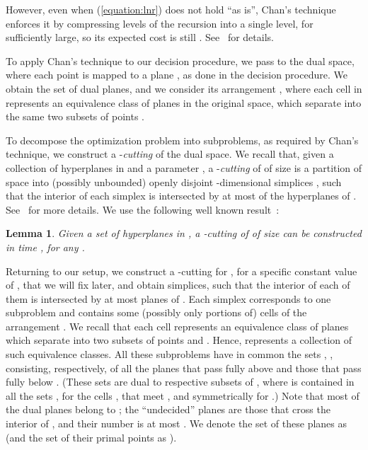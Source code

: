 \documentclass[a4paper,12pt]{article}
\newtheorem{lemma}[theorem]{Lemma}
\begin{document}
However, even when (\ref{equation:lnr}) does not hold ``as
is'', Chan's technique enforces it by compressing  levels of the
recursion into a single level, for  sufficiently large, so its expected cost is still . See~\cite{TCG} for details.


To apply Chan's technique to our decision procedure,
we pass to the dual space, where each point  is mapped to a
plane , as done in the decision procedure. We obtain the set  of dual planes, and we consider its arrangement
, where each cell  in  represents an
equivalence class of planes in the original space, which separate 
into the same two subsets of points .

To decompose the optimization problem into subproblems, as required
by Chan's technique, we construct a -\emph{cutting} of
the dual space. We recall that, given a collection  of 
hyperplanes in  and a parameter , a -\emph{cutting} of  of size  is a
partition of space into  (possibly unbounded) openly disjoint
-dimensional simplices , such that the
interior of each simplex  is intersected by at most
 of the hyperplanes of . See~\cite{JMC} for more
details.  We use the following well known result~\cite{BC, CF}:

\begin{lemma}
\label{lemma:cutting}
Given a set  of  hyperplanes in , a
-cutting of  of size  can be constructed
in time , for any .
\end{lemma}

Returning to our setup, we construct a -cutting for
, for a specific constant value of , that we will
fix later, and obtain  simplices, such that the
interior of each of them is intersected by at most 
planes of . Each simplex  corresponds to one
subproblem and contains some (possibly only portions of) cells
 of the arrangement . We recall that each
cell  represents an equivalence class of planes which
separate  into two subsets of points  and
. Hence,  represents a collection of such
equivalence classes. All these subproblems have in common the sets
, , consisting,
respectively, of all the planes that pass fully above  and
those that pass fully below . (These sets are dual to
respective subsets  of , where
 is contained in all the sets , for
the cells , that meet , and symmetrically for
.) Note that most of the dual planes belong to
; the ``undecided''
planes are those that cross the interior of , and their
number is at most . We denote the set of these planes as
 (and the set of their primal points as
).
\end{document}
